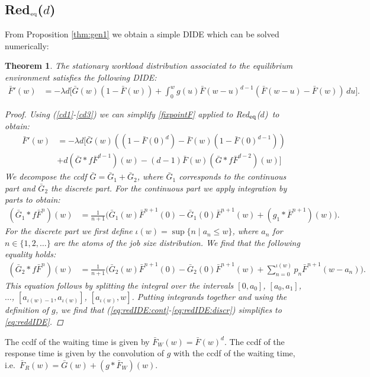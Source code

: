 \documentclass[12pt]{report}
\newcommand{\Redid}{Red$_{\textup{eq}}$($d$)}
\newtheorem{theorem}{Theorem}
\begin{document}
\subsection{\Redid}
From Proposition \ref{thm:gen1} we obtain a simple DIDE which can be solved numerically:
\begin{theorem}\label{thm:mainRed}
The stationary workload distribution associated to the equilibrium environment satisfies the following DIDE:
\begin{align}
\bar{F}'(w)
&= -\lambda d \bigg[ \bar G(w) (1-\bar F(w)) + \int_0^w g(u) \bar F(w-u)^{d-1} (\bar F(w-u) - \bar F(w) )\, du\bigg]
.\label{eq:reddIDE}
\end{align}
\begin{proof}
Using (\ref{cd1}-\ref{cd3}) we can simplify \eqref{fixpointF} applied to \Redid\ to obtain:
\begin{align}
\bar F'(w)
&=-\lambda d \bigg[
\bar G(w) \left( (1-\bar F(0)^d) - \bar F(w) (1-\bar F(0)^{d-1}) \right)\nonumber\\
&+d (\bar G * f \bar F^{d-1})(w)-(d-1)\bar F(w) (\bar G * f \bar F ^{d-2})(w)
\bigg]\label{eq:proof_mainredid1}
\end{align}
We decompose the ccdf $\bar G = \bar G_1 + \bar G_2$, where $\bar G_1$ corresponds to the continuous part and $\bar G_2$ the discrete part. For the continuous part we apply integration by parts to obtain:
\begin{align}
(\bar G_1 * f \bar F^n)(w) &= \frac{1}{n+1} \bigg( \bar G_1(w)  \bar F^{n+1}(0) - \bar{G}_1(0) \bar F^{n+1}(w) + (g_1 * \bar F ^{n+1}) (w)\bigg). \label{eq:redIDE:cont}
\end{align}
For the discrete part we first define $\iota(w)=\sup\{n \mid a_n \leq w\}$, where $a_n$ for $n\in \{1,2,\dots\}$ are the atoms of the job size distribution. We find that the following equality holds:
\begin{align}
(\bar G_2 * f \bar F^n)(w) &=  \frac{1}{n+1} \bigg( \bar G_2(w) \bar F^{n+1}(0)  - \bar G_2(0) \bar F^{n+1}(w) + \sum_{n=0}^{\iota(w)} p_n \bar F^{n+1}(w-a_n)\bigg). \label{eq:redIDE:discr}
\end{align}
This equation follows by splitting the integral over the intervals $[0,a_0]$, $[a_0,a_1]$, $\dots$, $[a_{\iota(w)-1},a_{\iota(w)}]$, $[a_{\iota(w)},w]$. Putting integrands together and using the definition of $g$, we find that (\ref{eq:redIDE:cont}-\ref{eq:redIDE:discr}) simplifies to \eqref{eq:reddIDE}.
\end{proof}
\end{theorem}
The ccdf of the waiting time is given by $\bar F_W(w)=\bar F(w)^d$. The ccdf of the response time is given by the convolution of $g$ with the ccdf of the waiting time, i.e.~$\bar F_R(w) = \bar G(w) + (g * \bar F_W)(w)$.
\end{document}
